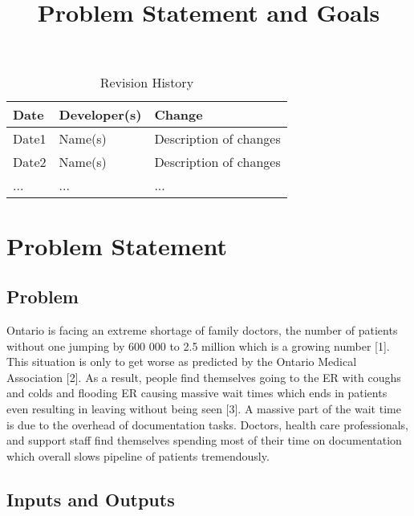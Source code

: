 \documentclass{article}
\title{Problem Statement and Goals\\\progname}
\author{\authname}
\date{}
\begin{document}
\maketitle

\begin{table}[hp]
\caption{Revision History} \label{TblRevisionHistory}
\begin{tabularx}{\textwidth}{llX}
\toprule
\textbf{Date} & \textbf{Developer(s)} & \textbf{Change}\\
\midrule
Date1 & Name(s) & Description of changes\\
Date2 & Name(s) & Description of changes\\
... & ... & ...\\
\bottomrule
\end{tabularx}
\end{table}

\section{Problem Statement}



\subsection{Problem}

Ontario is facing an extreme shortage of family doctors, the number of patients without one jumping by 600 000 to 2.5 million which is a growing number [1]. This situation is only to get worse as predicted by the Ontario Medical Association [2]. As a result, people find themselves going to the ER with coughs and colds and flooding ER causing massive wait times which ends in patients even resulting in leaving without being seen [3]. A massive part of the wait time is due to the overhead of documentation tasks. Doctors, health care professionals, and support staff find themselves spending most of their time on documentation which overall slows pipeline of patients tremendously.

\subsection{Inputs and Outputs}
\end{document}
